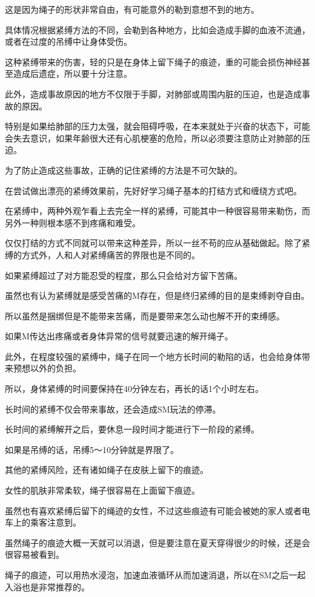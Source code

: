 \documentclass[12pt,UTF8]{ctexbook}
\begin{document}
这是因为绳子的形状非常自由，有可能意外的勒到意想不到的地方。

具体情况根据紧缚方法的不同，会勒到各种地方，比如会造成手脚的血液不流通，或者在过度的吊缚中让身体受伤。

这种紧缚带来的伤害，轻的只是在身体上留下绳子的痕迹，重的可能会损伤神经甚至造成后遗症，所以要十分注意。

此外，造成事故原因的地方不仅限于手脚，对肺部或周围内脏的压迫，也是造成事故的原因。

特别是如果给肺部的压力太强，就会阻碍呼吸，在本来就处于兴奋的状态下，可能会失去意识，如果年齢很大还有心肌梗塞的危险，所以必须要注意防止对肺部的压迫。

为了防止造成这些事故，正确的记住紧缚的方法是不可欠缺的。

在尝试做出漂亮的紧缚效果前，先好好学习绳子基本的打结方式和缠绕方式吧。

在紧缚中，两种外观乍看上去完全一样的紧缚，可能其中一种很容易带来勒伤，而另外一种则根本感不到疼痛和难受。

仅仅打结的方式不同就可以带来这种差异，所以一丝不苟的应从基础做起。除了紧缚的方式外，人和人对紧缚痛苦的界限也是不同的。

如果紧缚超过了对方能忍受的程度，那么只会给对方留下苦痛。

虽然也有认为紧缚就是感受苦痛的M存在，但是终归紧缚的目的是束缚剥夺自由。

所以虽然是捆绑但是不能带来苦痛，而是要带来怎么动也解不开的束缚感。

如果M传达出疼痛或者身体异常的信号就要迅速的解开绳子。

此外，在程度较强的紧缚中，绳子在同一个地方长时间的勒陷的话，也会给身体带来预想以外的负担。

所以，身体紧缚的时间要保持在40分钟左右，再长的话1个小时左右。

长时间的紧缚不仅会带来事故，还会造成SM玩法的停滞。

长时间的紧缚解开之后，要休息一段时间才能进行下一阶段的紧缚。

如果是吊缚的话，吊缚5～10分钟就是界限了。

其他的紧缚风险，还有诸如绳子在皮肤上留下的痕迹。

女性的肌肤非常柔软，绳子很容易在上面留下痕迹。

虽然也有喜欢紧缚后留下的绳迹的女性，不过这些痕迹有可能会被她的家人或者电车上的乘客注意到。

虽然绳子的痕迹大概一天就可以消退，但是要注意在夏天穿得很少的时候，还是会很容易被看到。

绳子的痕迹，可以用热水浸泡，加速血液循环从而加速消退，所以在SM之后一起入浴也是非常推荐的。
\end{document}
